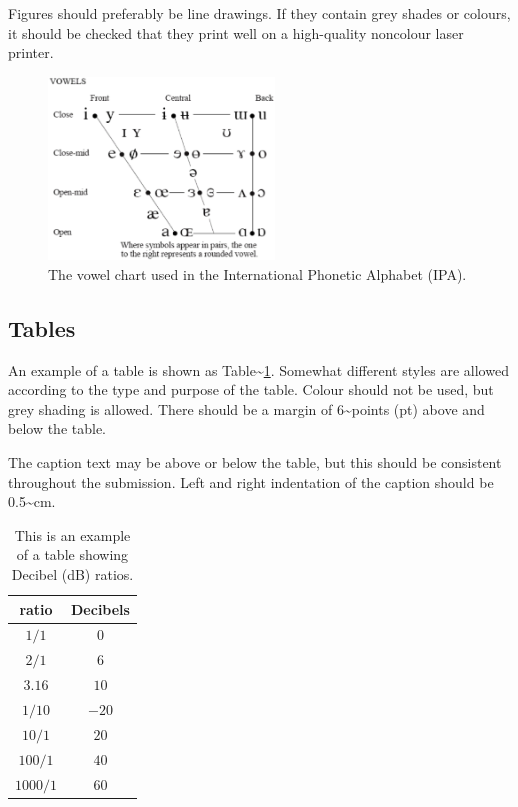 \documentclass[
  a4paper,
  11pt,
  twocolumn]{article}
\begin{document}
Figures should preferably be line drawings. If they contain grey shades
or colours, it should be checked that they print well on a high-quality
noncolour laser printer.

\begin{figure}[!ht]
\begin{center}
\includegraphics[width=6cm]{./includes/figures/ipa.eps}
\caption{The vowel chart used in the International Phonetic
Alphabet (IPA).}\label{fig:vowels}
\end{center}
\end{figure}

\subsection{Tables}

An example of a table is shown as
Table\textasciitilde{}\ref{tab:decibel}. Somewhat different styles are
allowed according to the type and purpose of the table. Colour should
not be used, but grey shading is allowed. There should be a margin of
6\textasciitilde points (pt) above and below the table.

The caption text may be above or below the table, but this should be
consistent throughout the submission. Left and right indentation of the
caption should be 0.5\textasciitilde cm.

\begin{table}[!ht]
  \begin{center}
  \begin{tabular}{|c|c|}
  \hline
  \rowcolor[gray]{.75}
  ratio    & Decibels\\
  \hline
  $1/1$    & $0$\\
  $2/1$    & $6$\\
  $3.16$   & $10$\\
  $1/10$   & $-20$\\
  $10/1$   & $20$\\
  $100/1$  & $40$\\
  $1000/1$ & $60$\\
  \hline
  \end{tabular}
  \caption{This is an example of a table showing Decibel (dB)
  ratios.}\label{tab:decibel}
  \end{center}
\end{table}
\end{document}
